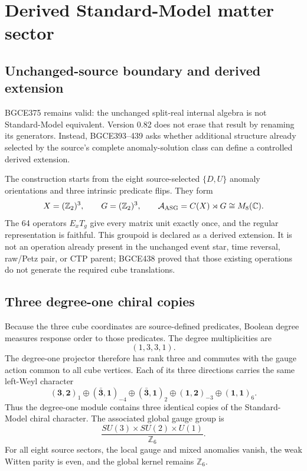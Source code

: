 \documentclass[11pt]{article}
\theoremstyle{definition}
\theoremstyle{remark}
\begin{document}
\section{Derived Standard-Model matter sector}\label{sec:sm082}

\subsection{Unchanged-source boundary and derived extension}

BGCE375 remains valid: the unchanged split-real internal algebra is not Standard-Model equivalent. Version 0.82 does not erase that result by renaming its generators. Instead, BGCE393--439 asks whether additional structure already selected by the source's complete anomaly-solution class can define a controlled derived extension.

The construction starts from the eight source-selected $\{D,U\}$ anomaly orientations and three intrinsic predicate flips. They form
\begin{equation}
 X=(\mathbb Z_2)^3,
 \qquad
 G=(\mathbb Z_2)^3,
 \qquad
 \mathcal A_{\rm ASG}=C(X)\rtimes G\cong M_8(\mathbb C).
\end{equation}
The 64 operators $E_xT_g$ give every matrix unit exactly once, and the regular representation is faithful. This groupoid is declared as a derived extension. It is not an operation already present in the unchanged event star, time reversal, raw/Petz pair, or CTP parent; BGCE438 proved that those existing operations do not generate the required cube translations.

\subsection{Three degree-one chiral copies}

Because the three cube coordinates are source-defined predicates, Boolean degree measures response order to those predicates. The degree multiplicities are
\begin{equation}
 (1,3,3,1).
\end{equation}
The degree-one projector therefore has rank three and commutes with the gauge action common to all cube vertices. Each of its three directions carries the same left-Weyl character
\begin{equation}
 (\mathbf3,\mathbf2)_1
 \oplus(\bar{\mathbf3},\mathbf1)_{-4}
 \oplus(\bar{\mathbf3},\mathbf1)_2
 \oplus(\mathbf1,\mathbf2)_{-3}
 \oplus(\mathbf1,\mathbf1)_6 .
\end{equation}
Thus the degree-one module contains three identical copies of the Standard-Model chiral character. The associated global gauge group is
\begin{equation}
 \frac{SU(3)\times SU(2)\times U(1)}{\mathbb Z_6}.
\end{equation}
For all eight source sectors, the local gauge and mixed anomalies vanish, the weak Witten parity is even, and the global kernel remains $\mathbb Z_6$.
\end{document}
